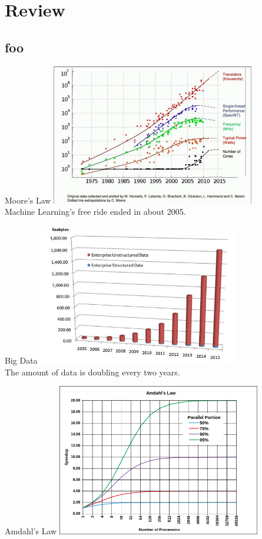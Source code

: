\documentclass[serif,xcolor=pdftex,dvipsnames,table,hyperref={bookmarks=false,breaklinks}]{beamer}
\begin{document}
\maketitlepage

\section{Review}
\subsection{foo}

\begin{frame}[t]{Moore's Law}
\center
\includegraphics[width=3.5in]{../Figures/moores_law.png}\\[6pt]

Machine Learning's free ride ended in about 2005.
\end{frame}

\begin{frame}[t]{Big Data}
\center
\includegraphics[width=3.5in]{../Figures/big_data.jpg}\\[6pt]

The amount of data is doubling every two years. 
\end{frame}

\begin{frame}[t]{Amdahl's Law}
\center
\includegraphics[width=3.5in]{../Figures/AmdahlsLaw.png}\\
\end{frame}
\end{document}
